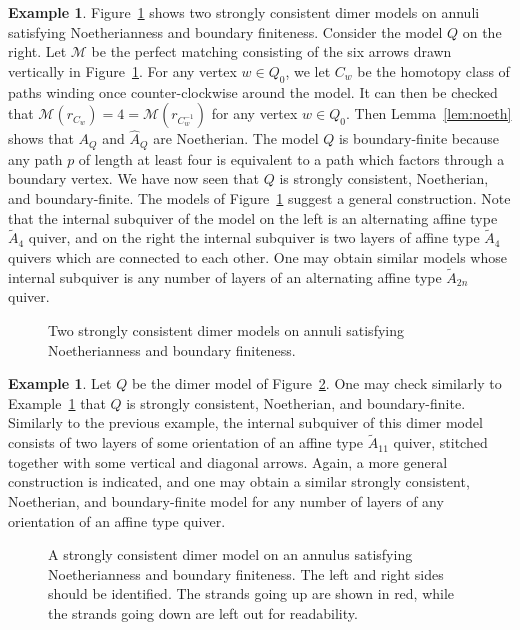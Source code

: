 \documentclass{article}
\theoremstyle{definition}
\newtheorem{example}[thm]{Example}
\begin{document}
\begin{example}\label{ex:noeth-fin}
	Figure~\ref{fig:noeth-fin} shows two strongly consistent dimer models on annuli satisfying Noetherianness and boundary finiteness.
	Consider the model $Q$ on the right. Let $\mathcal M$ be the perfect matching consisting of the six arrows drawn vertically in Figure~\ref{fig:noeth-fin}.
	For any vertex $w\in Q_0$, we let $C_w$ be the homotopy class of paths winding once counter-clockwise around the model. It can then be checked that $\mathcal M(r_{C_w})=4=\mathcal M(r_{C_w^{-1}})$ for any vertex $w\in Q_0$.
	Then Lemma~\ref{lem:noeth} shows that $A_Q$ and $\widehat A_Q$ are Noetherian.
	The model $Q$ is boundary-finite because any path $p$ of length at least four is equivalent to a path which factors through a boundary vertex. We have now seen that $Q$ is strongly consistent, Noetherian, and boundary-finite.
	The models of Figure~\ref{fig:noeth-fin} suggest a general construction. Note that the internal subquiver of the model on the left is an alternating affine type $\widetilde A_4$ quiver, and on the right the internal subquiver is two layers of affine type $\widetilde A_4$ quivers which are connected to each other. One may obtain similar models whose internal subquiver is any number of layers of an alternating affine type $\widetilde A_{2n}$ quiver.
	\def\svgwidth{300pt}
	\begin{figure}
		\centering
		
		\caption{Two strongly consistent dimer models on annuli satisfying Noetherianness and boundary finiteness.}
		\label{fig:noeth-fin}
	\end{figure}
\end{example}
\begin{example}\label{ex:noeth-finn}
	Let $Q$ be the dimer model of Figure~\ref{fig:noeth-finn}. One may check similarly to Example~\ref{ex:noeth-fin} that $Q$ is strongly consistent, Noetherian, and boundary-finite. Similarly to the previous example, the internal subquiver of this dimer model consists of two layers of some orientation of an affine type $\widetilde A_{11}$ quiver, stitched together with some vertical and diagonal arrows. Again, a more general construction is indicated, and one may obtain a similar strongly consistent, Noetherian, and boundary-finite model for any number of layers of any orientation of an affine type quiver.
	\def\svgwidth{300pt}
	\begin{figure}
		\centering
		
		\caption{A strongly consistent dimer model on an annulus satisfying Noetherianness and boundary finiteness. The left and right sides should be identified. The strands going up are shown in red, while the strands going down are left out for readability.}
		\label{fig:noeth-finn}
	\end{figure}
\end{example}
\end{document}
